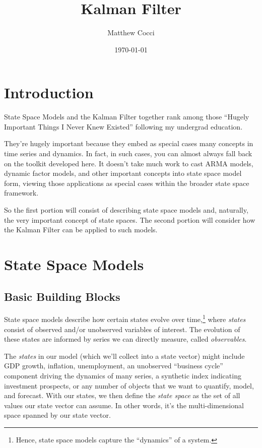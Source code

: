 \documentclass[a4paper,12pt]{article}
\author{Matthew Cocci}
\title{Kalman Filter}
\date{\today}
\begin{document}
\maketitle


\section{Introduction}

State Space Models and the Kalman Filter together rank among those ``Hugely Important Things I Never Knew Existed'' following my undergrad education. 

They're hugely important because they embed as special cases many concepts in time series and dynamics. In fact, in such cases, you can almost always fall back on the toolkit developed here. It doesn't take much work to cast ARMA models, dynamic factor models, and other important concepts into state space model form, viewing those applications as special cases within the broader state space framework.

So the first portion will consist of describing state
space models and, naturally, the very important concept of
state spaces. The second portion will consider how the Kalman Filter can be applied to such models.

\section{State Space Models}

\subsection{Basic Building Blocks}

State space models describe how certain states evolve over time,\footnote{Hence, state space models capture the ``dynamics'' of a system.} where \emph{states} consist of observed and/or unobserved variables of interest. The evolution of these states are informed by series we can directly measure, called \emph{observables}.

The \emph{states} in our model (which we'll collect into a state vector) might include GDP growth, inflation, unemployment, an unobserved ``business cycle'' component driving the dynamics of many series, a synthetic index indicating investment prospects, or any number of objects that we want to quantify, model, and forecast. With our states, we then define the \emph{state space} as the set of all values our state vector can assume. In other words, it's the multi-dimensional space spanned by our state vector. 
\end{document}
